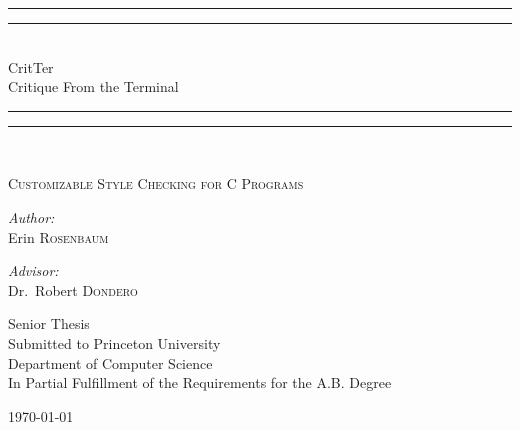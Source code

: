 \begin{titlepage}

\begin{center}

\rule{\linewidth}{1.6pt}\vspace*{-\baselineskip}\vspace*{2pt}
\rule{\linewidth}{0.4pt}\\[\baselineskip]
{\huge CritTer \\[0.5\baselineskip] Critique From the Terminal}\\[0.2\baselineskip]
\rule{\linewidth}{0.4pt}\vspace*{-\baselineskip}\vspace{3.2pt}
\rule{\linewidth}{1.6pt}\\[\baselineskip]
{\scshape
\Large Customizable Style Checking for C Programs \par}
\vspace*{4\baselineskip}

\begin{minipage}{0.4\textwidth}
\begin{flushleft} \large
\emph{Author:}\\
Erin \textsc{Rosenbaum}
\end{flushleft}
\end{minipage}
\begin{minipage}{0.4\textwidth}
\begin{flushright} \large
\emph{Advisor:} \\
Dr.~Robert \textsc{Dondero}
\end{flushright}
\end{minipage}

\vspace{5cm}
\small{
Senior Thesis \\[0.4cm]
Submitted to Princeton University \\
Department of Computer Science\\
In Partial Fulfillment of the Requirements for the A.B. Degree \\
}

\vfill

{\large \today}

\end{center}

\end{titlepage}
